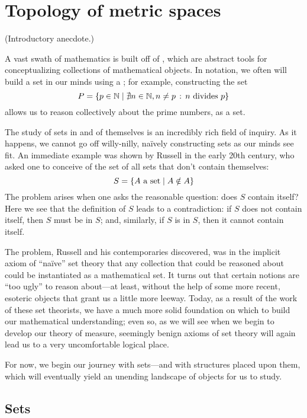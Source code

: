 

\chapter{Topology of metric spaces}

(Introductory anecdote.)

A vast swath of mathematics is built off of , which are abstract tools for conceptualizing collections of mathematical objects. In notation, we often will build a set in our minds using a ; for example, constructing the set
\[ P = \left\{ p \in \mathbb{N} \mid \nexists n \in \mathbb{N}, n \neq p \,:\, n \textrm{ divides } p \right\} \]
allows us to reason collectively about the prime numbers, as a set.

The study of sets in and of themselves is an incredibly rich field of inquiry. As it happens, we cannot go off willy-nilly, naïvely constructing sets as our minds see fit. An immediate example was shown by Russell in the early 20th century, who asked one to conceive of the set of all sets that don't contain themselves:
\[ S = \left\{ A \textrm{ a set} \mid A \notin A \right\} \]
The problem arises when one asks the reasonable question: does $S$ contain itself? Here we see that the definition of $S$ leads to a contradiction: if $S$ does not contain itself, then $S$ must be in $S$; and, similarly, if $S$ is in $S$, then it cannot contain itself.

The problem, Russell and his contemporaries discovered, was in the implicit axiom of ``naïve'' set theory that any collection that could be reasoned about could be instantiated as a mathematical set. It turns out that certain notions are ``too ugly'' to reason about---at least, without the help of some more recent, esoteric objects that grant us a little more leeway. Today, as a result of the work of these set theorists, we have a much more solid foundation on which to build our mathematical understanding; even so, as we will see when we begin to develop our theory of measure, seemingly benign axioms of set theory will again lead us to a very uncomfortable logical place.

For now, we begin our journey with sets---and with structures placed upon them, which will eventually yield an unending landscape of objects for us to study.

\section{Sets}

